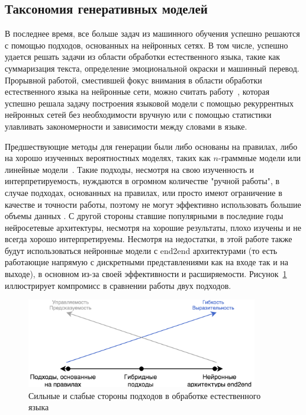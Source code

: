 \documentclass{spbau-diploma}
\begin{document}
\subsection{Таксономия генеративных моделей}
В последнее время, все больше задач из машинного обучения успешно решаются с 
помощью подходов, основанных на нейронных сетях. В том числе, успешно удается
решать задачи из области обработки естественного языка, такие как суммаризация
текста, определение эмоциональной окраски и машинный перевод. Прорывной работой,
сместившей фокус внимания в области обработки естественного языка на нейронные
сети, можно считать работу~\cite{rnnlm}, которая успешно решала
задачу построения языковой модели с помощью рекуррентных нейронных сетей без
необходимости вручную или с помощью статистики улавливать закономерности и 
зависимости между словами в языке.

Предшествующие методы для генерации были либо 
основаны на правилах, либо на хорошо изученных вероятностных моделях, таких как
$n$-граммные модели или линейные модели~\cite{statmodel1, statmodel2}. 
Такие подходы,
несмотря на свою изученность и интерпретируемость, нуждаются в огромном 
количестве "ручной работы", в случае подходах, основанных на правилах, или 
просто имеют ограничение в качестве и точности работы, поэтому не могут 
эффективно использовать большие объемы данных \cite{1602.02410}. 
С другой стороны ставшие популярными в 
последние годы нейросетевые архитектуры, несмотря на хорошие результаты, плохо 
изучены и не всегда хорошо интерпретируемы. Несмотря на недостатки, в этой 
работе также будут использоваться нейронные модели с end2end архитектурами (то 
есть работающие напрямую с дискретными представлениями как на входе так 
и на выходе), в основном из-за своей эффективности и расширяемости.
Рисунок~\ref{approaches} иллюстрирует компромисс в сравнении работы двух 
подходов.

\begin{figure}[H]
\centering
\includegraphics[width=0.9\textwidth]{images/approaches.png}
\caption{Сильные и слабые стороны подходов в обработке естественного языка}
\label{approaches}
\end{figure}
\end{document}
